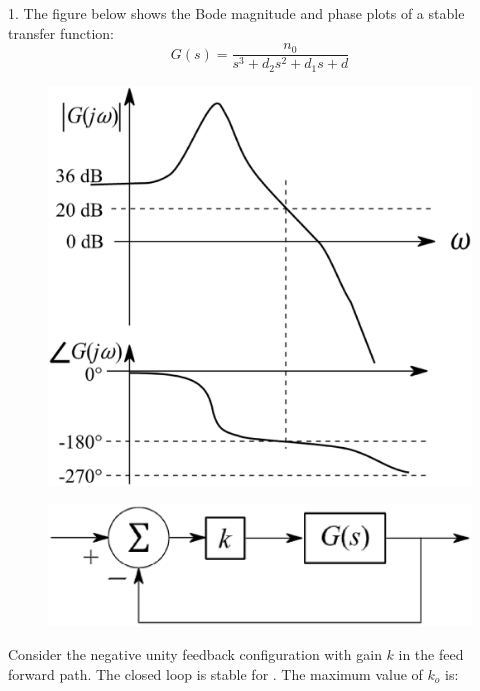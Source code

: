 \begin{enumerate}[label=\thesection.\arabic*.,ref=\thesection.\theenumi]
1. The figure below shows the Bode magnitude and phase plots of a stable transfer function:
\begin{equation}  
            G(s) = \frac{n_0}{s^3 + d_2 s^2 + d_1 s + d}
\end{equation}
\begin{figure}[h]

    \includegraphics[scale = 0.25]{./figs/q42_1.eps}
 
\end{figure}
\begin{figure}[h]

    \includegraphics[scale = 0.4]{./figs/q42.eps}

\end{figure}
 Consider the negative unity feedback configuration with gain $k$ in the feed forward path. The closed loop is stable for  . 
    The maximum value of $k_o$  is: \\



\end{enumerate}
